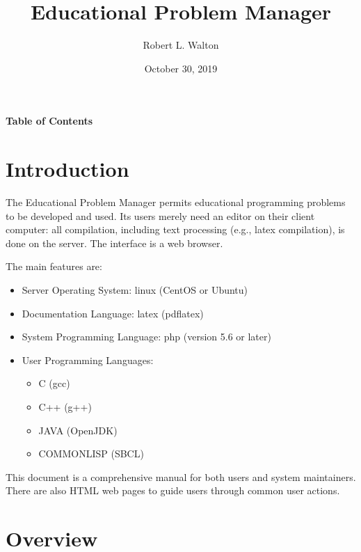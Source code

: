 \documentclass[12pt]{article}
\makeatletter
\renewcommand\tableofcontents{%
    \begin{list}{}%
	     {\setlength{\itemsep}{0in}%
	      \setlength{\topsep}{0in}%
	      \setlength{\parsep}{1ex}%
	      \setlength{\labelwidth}{0in}%
	      \setlength{\baselineskip}{1.5ex}%
	      \setlength{\leftmargin}{0.8in}%
	      \setlength{\rightmargin}{0.8in}}%
    \item\@starttoc{toc}%
    \end{list}}
\makeatother
\begin{document}
        
\title{Educational Problem Manager}

\author{Robert L. Walton}

\date{October 30, 2019}
 
\maketitle

\newpage
\begin{center}
\large \bf Table of Contents
\end{center}

\bigskip

\tableofcontents 

\newpage

\section{Introduction}

The Educational Problem Manager permits educational programming
problems to be developed and used.  Its users merely need an
editor on their client computer: all compilation, including
text processing (e.g., latex compilation), is done on the
server.  The interface is a web browser.

The main features are:

\begin{itemize}
\item Server Operating System: linux (CentOS or Ubuntu)
\item Documentation Language: latex (pdflatex)
\item System Programming Language: php (version 5.6 or later)
\item User Programming Languages:
\begin{itemize}
\item C (gcc)
\item C++ (g++)
\item JAVA (OpenJDK)
\item COMMONLISP (SBCL)
\end{itemize}

\end{itemize}

This document is a comprehensive manual for both users and
system maintainers.  There are also HTML web pages to guide
users through common user actions.

\section{Overview}
\end{document}
